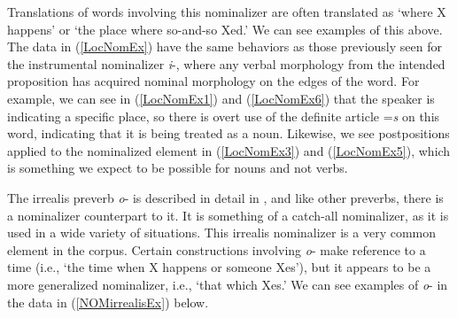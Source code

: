 Translations of words involving this nominalizer are often translated as `where X happens' or `the place where so-and-so Xed.' We can see examples of this above. The data in (\ref{LocNomEx}) have the same behaviors as those previously seen for the instrumental nominalizer \textit{i}-, where any verbal morphology from the intended proposition has acquired nominal morphology on the edges of the word. For example, we can see in (\ref{LocNomEx1}) and (\ref{LocNomEx6}) that the speaker is indicating a specific place, so there is overt use of the definite article =\textit{s} on this word, indicating that it is being treated as a noun. Likewise, we see postpositions applied to the nominalized element in (\ref{LocNomEx3}) and (\ref{LocNomEx5}), which is something we expect to be possible for nouns and not verbs.

\label{SubSubSubIrrealisNom}

The irrealis preverb \textit{o}- is described in detail in , and like other preverbs, there is a nominalizer counterpart to it. It is something of a catch-all nominalizer, as it is used in a wide variety of situations. This irrealis nominalizer is a very common element in the corpus. Certain constructions involving \textit{o}- make reference to a time (i.e., `the time when X happens or someone Xes'), but it appears to be a more generalized nominalizer, i.e., `that which Xes.' We can see examples of \textit{o}- in the data in (\ref{NOMirrealisEx}) below.


